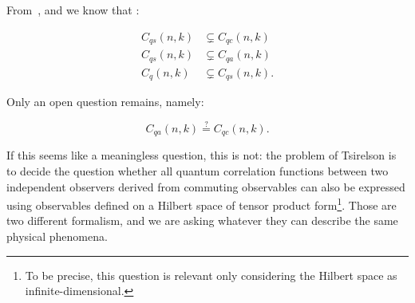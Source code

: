 From~\cite{ts1}, \cite{ts2} and \cite{ts3} we know that :

\begin{theorem}
    \begin{align}
    C_{q s}(n, k) &\subsetneq C_{q c}(n, k) \\
     C_{q s}(n, k) &\subsetneq C_{q a}(n, k) \\
    C_{q}(n, k) &\subsetneq C_{q s}(n, k).
    \end{align}
\end{theorem}

Only an open question remains, namely: 

\begin{problem}
    \begin{equation}
    C_{q a}(n, k) \stackrel{?}= C_{q c}(n, k).
    \end{equation}
\end{problem}

If this seems like a meaningless question, this is not: the problem of Tsirelson is to decide the question whether all quantum correlation functions between two independent observers derived from commuting observables can also be expressed using observables defined on a Hilbert space of tensor product form\footnote{To be precise, this question is relevant only considering the Hilbert space as infinite-dimensional.}. Those are two different formalism, and we are asking whatever they can describe the same physical phenomena.